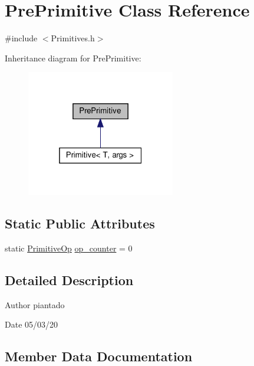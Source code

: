 \hypertarget{struct_pre_primitive}{}\section{Pre\+Primitive Class Reference}
\label{struct_pre_primitive}


{\ttfamily \#include $<$Primitives.\+h$>$}



Inheritance diagram for Pre\+Primitive\+:
\nopagebreak
\begin{figure}[H]
\begin{center}
\leavevmode
\includegraphics[width=184pt]{struct_pre_primitive__inherit__graph}
\end{center}
\end{figure}
\subsection*{Static Public Attributes}
\begin{DoxyCompactItemize}
\item 
static \hyperlink{_instruction_8h_a227278394efd1e2313c727102db09ea9}{Primitive\+Op} \hyperlink{struct_pre_primitive_a8f4088dc0a3fe00fd81c509bb0af1881}{op\+\_\+counter} = 0
\end{DoxyCompactItemize}


\subsection{Detailed Description}
\begin{DoxyAuthor}{Author}
piantado 
\end{DoxyAuthor}
\begin{DoxyDate}{Date}
05/03/20 
\end{DoxyDate}


\subsection{Member Data Documentation}
\mbox{\label{struct_pre_primitive_a8f4088dc0a3fe00fd81c509bb0af1881}} 
